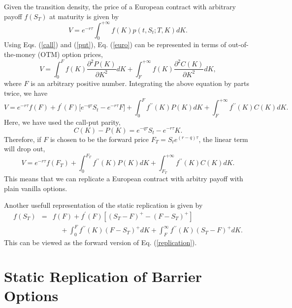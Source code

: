 \documentclass[12pt]{article}
\begin{document}
  Given the transition density, the price of a European contract with arbitrary payoff $f(S_T)$ at maturity is given by
  \begin{equation}
    V = e^{-r\tau}\int_{0}^{+\infty}f(K)p(t,S_t;T,K)dK.
    \label{euro}
  \end{equation}
  Using Eqs. (\ref{call}) and (\ref{put}), Eq. (\ref{euro}) can be represented in terms of out-of-the-money (OTM) option prices,
  \begin{equation}
    V = \int_{0}^{F}f(K)\frac{\partial^2P(K)}{\partial K^2}dK + \int_{F}^{+\infty}f(K)\frac{\partial^2C(K)}{\partial K^2}dK,
  \end{equation}
  where $F$ is an arbitrary positive number. Integrating the above equation by parts twice, we have
  \begin{equation}
    V = e^{-r\tau}f(F) + f^{\prime}(F)\big[e^{-q\tau}S_t-e^{-r\tau}F\big] +
           \int_{0}^{F}f^{\prime\prime}(K)P(K)dK + \int_{F}^{+\infty}f^{\prime\prime}(K)C(K)dK.
    \label{replication}
  \end{equation}
  Here, we have used the call-put parity,
  \begin{equation}
    C(K) - P(K) = e^{-q\tau}S_t-e^{-r\tau}K.
  \end{equation}
  Therefore, if $F$ is chosen to be the forward price $F_T=S_te^{(r-q)\tau}$, the linear term will drop out,
  \begin{equation}
    V = e^{-r\tau}f(F_T) +
           \int_{0}^{F_T}f^{\prime\prime}(K)P(K)dK + \int_{F_T}^{+\infty}f^{\prime\prime}(K)C(K)dK.
  \end{equation}
  This means that we can replicate a European contract with arbitry payoff with plain vanilla options.

  Another usefull representation of the static replication is given by
  \begin{eqnarray}
    f(S_T)&=&f(F)+f^{\prime}(F)\left[\left(S_T-F\right)^+-\left(F-S_T\right)^+\right]\nonumber\\
            &&\ \ \ \ \ +\int_0^Ff^{\prime\prime}(K)\left(F-S_T\right)^+dK+\int_F^{\infty}f^{\prime\prime}(K)\left(S_T-F\right)^+dK.
  \end{eqnarray}
  This can be viewed as the forward version of Eq. (\ref{replication}).


\section{Static Replication of Barrier Options}
\end{document}
